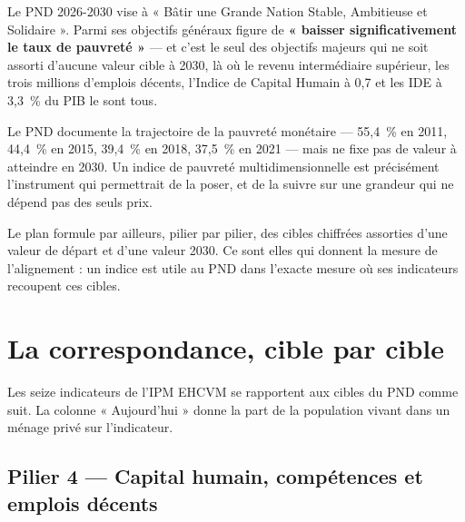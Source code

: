 \documentclass[11pt,a4paper]{article}
\begin{document}
Le PND 2026-2030 vise à « Bâtir une Grande Nation Stable, Ambitieuse et Solidaire ». Parmi ses
objectifs généraux figure de \textbf{« baisser significativement le taux de pauvreté »} --- et
c'est le seul des objectifs majeurs qui ne soit assorti d'aucune valeur cible à 2030, là où le
revenu intermédiaire supérieur, les trois millions d'emplois décents, l'Indice de Capital Humain à
0,7 et les IDE à 3,3~\% du PIB le sont tous.

\begin{retenir}
Le PND documente la trajectoire de la pauvreté monétaire --- 55,4~\% en 2011, 44,4~\% en 2015,
39,4~\% en 2018, 37,5~\% en 2021 --- mais ne fixe pas de valeur à atteindre en 2030. Un indice de
pauvreté multidimensionnelle est précisément l'instrument qui permettrait de la poser, et de la
suivre sur une grandeur qui ne dépend pas des seuls prix.
\end{retenir}

Le plan formule par ailleurs, pilier par pilier, des cibles chiffrées assorties d'une valeur de
départ et d'une valeur 2030. Ce sont elles qui donnent la mesure de l'alignement : un indice est
utile au PND dans l'exacte mesure où ses indicateurs recoupent ces cibles.

\section{La correspondance, cible par cible}
\label{sec:correspondance}

Les seize indicateurs de l'IPM EHCVM se rapportent aux cibles du PND comme suit. La colonne
« Aujourd'hui » donne la part de la population vivant dans un ménage privé sur l'indicateur.

\subsection{Pilier 4 --- Capital humain, compétences et emplois décents}
\end{document}
